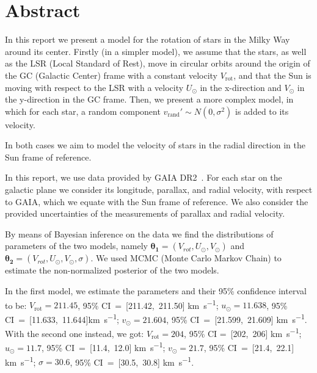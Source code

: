 \section*{Abstract}

In this report we present a model for the rotation of stars in the Milky Way around its center.
Firstly (in a simpler model), we assume that the stars, as well as the LSR (Local Standard of Rest), 
move in circular orbits around the origin of the GC (Galactic Center) frame with a constant velocity $V_{\text{rot}}$, 
and that the Sun is moving with respect to the LSR 
with a velocity $U_{\odot}$ in the x-direction and $V_{\odot}$ in the y-direction in the GC frame. 
Then, we present a more complex model, in which for each star, 
a random component $v_{\text{rand}}' \sim N(0, \sigma^2)$ is added to its velocity.


In both cases we aim to model the velocity of stars in the radial direction 
in the Sun frame of reference.

In this report, we use data provided by GAIA DR2~\cite{GAIADR2}.
For each star on the galactic plane we consider its longitude, parallax, and radial velocity,
with respect to GAIA, which we equate with the Sun frame of reference.
We also consider the provided uncertainties of the measurements of parallax and radial velocity.

By means of Bayesian inference on the data we find the distributions 
of parameters of the two models, 
namely $\mathbf{\theta_1} = (V_{rot}, U_{\odot}, V_{\odot})$ 
and $\mathbf{\theta_2} = (V_{rot}, U_{\odot}, V_{\odot}, \sigma)$.
We used MCMC (Monte Carlo Markov Chain) 
to estimate the non-normalized posterior of the two models. 

In the first model, we estimate the parameters and their 95\% confidence interval to be: 
$V_{\text{rot}} = 211.45$, 95\% CI~=~[211.42,~211.50] \unit{\kilo\meter\per\second}; 
$u_{\odot} = 11.638$, 95\% CI~=~[11.633,~11.644]\unit{\kilo\meter\per\second}; 
$v_{\odot} = 21.604$, 95\% CI~=~[21.599,~21.609] \unit{\kilo\meter\per\second}. 
With the second one instead, we got: 
$V_{\text{rot}}= 204$, 95\% CI =~[202,~206] \unit{\kilo\meter\per\second}; 
$u_{\odot} = 11.7$, 95\% CI~=~[11.4,~12.0] \unit{\kilo\meter\per\second}; 
$v_{\odot} = 21.7$, 95\% CI~=~[21.4,~22.1] \unit{\kilo\meter\per\second}; 
$\sigma = 30.6$, 95\% CI~=~[30.5,~30.8] \unit{\kilo\meter\per\second}.